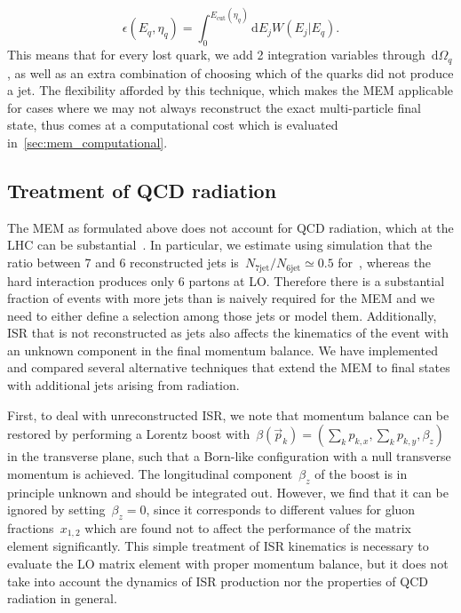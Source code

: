 \begin{equation}
\epsilon(E_q, \eta_q) = \int_0^{E_{\mathrm{cut}}(\eta_q)} \mathrm{d}E_j W(E_j | E_q).
\end{equation}
This means that for every lost quark, we add 2 integration variables through~$\mathrm{d}\Omega_q$, as well as an extra combination of choosing which of the quarks did not produce a jet. The flexibility afforded by this technique, which makes the MEM applicable for cases where we may not always reconstruct the exact multi-particle final state, thus comes at a computational cost which is evaluated in~\cref{sec:mem_computational}.

\subsection{Treatment of QCD radiation}
\label{sec:mem_radiation}

The MEM as formulated above does not account for QCD radiation, which at the LHC can be substantial~\cite{Alwall:2010cq}. In particular, we estimate using simulation that the ratio between 7 and 6 reconstructed jets is~$N_{7\mathrm{jet}}/N_{6\mathrm{jet}} \simeq 0.5$ for~\ttHbb, whereas the hard interaction produces only 6 partons at LO. Therefore there is a substantial fraction of events with more jets than is naively required for the MEM and we need to either define a selection among those jets or model them. Additionally, ISR that is not reconstructed as jets also affects the kinematics of the event with an unknown component in the final momentum balance. We have implemented and compared several alternative techniques that extend the MEM to final states with additional jets arising from radiation.

First, to deal with unreconstructed ISR, we note that momentum balance can be restored by performing a Lorentz boost with~$\beta(\vec{p}_k) = (\sum_k p_{k,x}, \sum_k p_{k,y}, \beta_z)$ in the transverse plane, such that a Born-like configuration with a null transverse momentum is achieved. The longitudinal component~$\beta_z$ of the boost is in principle unknown and should be integrated out. However, we find that it can be ignored by setting~$\beta_z = 0$, since it corresponds to different values for gluon fractions~$x_{1,2}$ which are found not to affect the performance of the matrix element significantly. This simple treatment of ISR kinematics is necessary to evaluate the LO matrix element with proper momentum balance, but it does not take into account the dynamics of ISR production nor the properties of QCD radiation in general.

